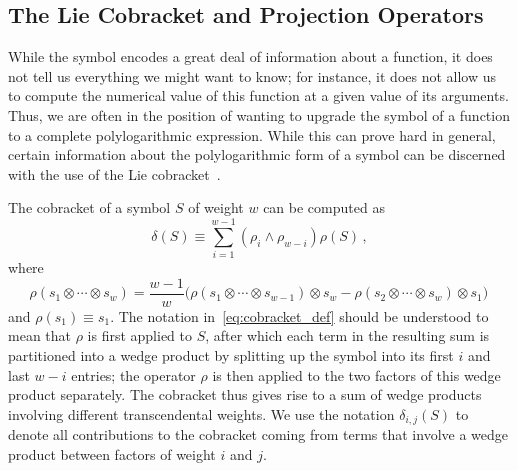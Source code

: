 \documentclass[11pt]{article}
\begin{document}


\subsection{The Lie Cobracket and Projection Operators}
\label{sec:lie_cobracket}

While the symbol encodes a great deal of information about a function, it does not tell us everything we might want to know; for instance, it does not allow us to compute the numerical value of this function at a given value of its arguments. Thus, we are often in the position of wanting to upgrade the symbol of a function to a complete polylogarithmic expression. While this can prove hard in general, certain information about the polylogarithmic form of a symbol can be discerned with the use of the Lie cobracket~\cite{Golden:2013xva}. 

The cobracket of a symbol $S$ of weight $w$ can be computed as
\begin{equation} \label{eq:cobracket_def}
\delta(S) \equiv \sum_{i=1}^{w-1} (\rho_i \wedge \rho_{w-i})\rho(S) \, ,
\end{equation}
where
\begin{equation}
\rho(s_1 \otimes \cdots \otimes s_w ) = \frac{w-1}{w} \Big(\rho(s_1 \otimes \cdots \otimes s_{w-1}) \otimes s_w - \rho(s_2 \otimes \cdots \otimes s_{w}) \otimes s_1 \Big) \, 
\end{equation}
and $\rho(s_1) \equiv s_1$. The notation in~\eqref{eq:cobracket_def} should be understood to mean that $\rho$ is first applied to $S$, after which each term in the resulting sum is partitioned into a wedge product by splitting up the symbol into its first $i$ and last $w{-}i$ entries; the operator $\rho$ is then applied to the two factors of this wedge product separately. The cobracket thus gives rise to a sum of wedge products involving different transcendental weights. We use the notation $\delta_{i,j}(S)$ to denote all contributions to the cobracket coming from terms that involve a wedge product between factors of weight $i$ and $j$. 
\end{document}
